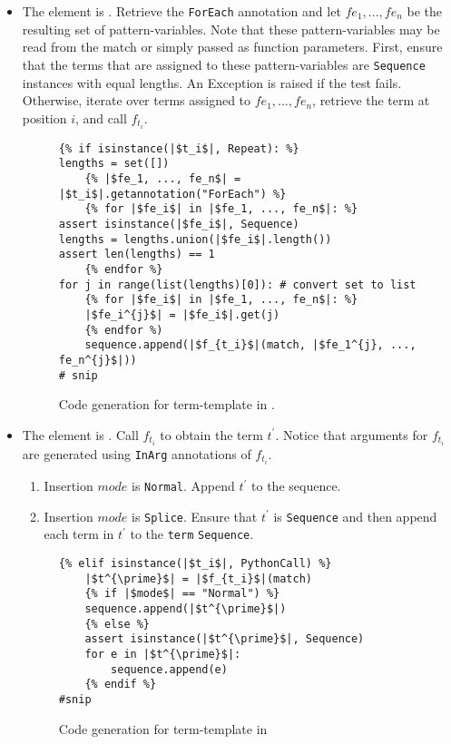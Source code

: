 \begin{itemize}
\item
The element is \TermRepeat. Retrieve the \texttt{ForEach} annotation and let $fe_1, ..., fe_n$ be the resulting set of pattern-variables. Note that these pattern-variables may be read from the match or simply passed as function parameters. First, ensure that the terms that are assigned to these pattern-variables are \texttt{Sequence} instances with equal lengths. An Exception is raised if the test fails. Otherwise, iterate over terms assigned to $fe_1, ..., fe_n$, retrieve the term at position $i$, and call $f_{t_i}$.

\begin{figure}
\begin{verbatim}
{% if isinstance(|$t_i$|, Repeat): %}
lengths = set([])
	{% |$fe_1, ..., fe_n$| = |$t_i$|.getannotation("ForEach") %}
	{% for |$fe_i$| in |$fe_1, ..., fe_n$|: %}
assert isinstance(|$fe_i$|, Sequence)
lengths = lengths.union(|$fe_i$|.length())
assert len(lengths) == 1
	{% endfor %}
for j in range(list(lengths)[0]): # convert set to list
	{% for |$fe_i$| in |$fe_1, ..., fe_n$|: %}
	|$fe_i^{j}$| = |$fe_i$|.get(j)
	{% endfor %)
	sequence.append(|$f_{t_i}$|(match, |$fe_1^{j}, ..., fe_n^{j}$|))
# snip
\end{verbatim}
\caption{Code generation for term-template \RepeatNoArg \space in \TermSequenceNoArg.}
\label{codegen-term-sequence-repeat}
\end{figure}

\item
	The element is \PythonCall. Call $f_{t_i}$ to obtain the term $t^{\prime}$. Notice that arguments for $f_{t_i}$ are generated using \texttt{InArg} annotations of $f_{t_i}$.
	\begin{enumerate}
	\item Insertion $mode$ is \texttt{Normal}. Append $t^{\prime}$ to the sequence.
	\item Insertion $mode$ is \texttt{Splice}. Ensure that $t^{\prime}$ is \texttt{Sequence} and then append each term in $t^{\prime}$ to the \texttt{term} \texttt{Sequence}.
	\end{enumerate}

\begin{figure}
\begin{verbatim}
{% elif isinstance(|$t_i$|, PythonCall) %}
	|$t^{\prime}$| = |$f_{t_i}$|(match)
	{% if |$mode$| == "Normal") %}
	sequence.append(|$t^{\prime}$|)
	{% else %}
	assert isinstance(|$t^{\prime}$|, Sequence)
	for e in |$t^{\prime}$|:
		sequence.append(e)
	{% endif %}
#snip
\end{verbatim}
\caption{Code generation for term-template \PythonCallNoArg \space in \TermSequenceNoArg}
\label{codegen-term-sequence-pycall}
\end{figure}


\end{itemize}
